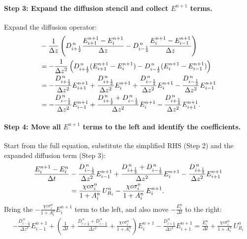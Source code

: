 \documentclass{article}
\begin{document}
\paragraph{Step 3: Expand the diffusion stencil and collect $E^{n+1}$ terms.}
Expand the diffusion operator:
\begin{align}
&-\frac{1}{\Delta z}\left(
D_{i+\frac12}^{\,n}\frac{E_{i+1}^{n+1}-E_i^{n+1}}{\Delta z}
-
D_{i-\frac12}^{\,n}\frac{E_{i}^{n+1}-E_{i-1}^{n+1}}{\Delta z}
\right)\notag\\
&=
-\frac{1}{\Delta z^2}\left(
D_{i+\frac12}^{\,n}(E_{i+1}^{n+1}-E_i^{n+1})
-
D_{i-\frac12}^{\,n}(E_{i}^{n+1}-E_{i-1}^{n+1})
\right)\notag\\
&=
-\frac{D_{i+\frac12}^{\,n}}{\Delta z^2}E_{i+1}^{n+1}
+\frac{D_{i+\frac12}^{\,n}}{\Delta z^2}E_i^{n+1}
+\frac{D_{i-\frac12}^{\,n}}{\Delta z^2}E_i^{n+1}
-\frac{D_{i-\frac12}^{\,n}}{\Delta z^2}E_{i-1}^{n+1}\notag\\
&=
-\frac{D_{i-\frac12}^{\,n}}{\Delta z^2}E_{i-1}^{n+1}
+\frac{D_{i+\frac12}^{\,n}+D_{i-\frac12}^{\,n}}{\Delta z^2}E_i^{n+1}
-\frac{D_{i+\frac12}^{\,n}}{\Delta z^2}E_{i+1}^{n+1}.
\end{align}

\paragraph{Step 4: Move all $E^{n+1}$ terms to the left and identify the coefficients.}
Start from the full equation, substitute the simplified RHS (Step 2) and the expanded diffusion term (Step 3):
\begin{align}
\frac{E_i^{n+1}-E_i^n}{\Delta t}
&-\frac{D_{i-\frac12}^{\,n}}{\Delta z^2}E_{i-1}^{n+1}
+\frac{D_{i+\frac12}^{\,n}+D_{i-\frac12}^{\,n}}{\Delta z^2}E_i^{n+1}
-\frac{D_{i+\frac12}^{\,n}}{\Delta z^2}E_{i+1}^{n+1}\notag\\
&=
\frac{\chi c \sigma_i^{n}}{1+A_i^n}\,U_{R_i}^n
-
\frac{\chi c \sigma_i^{n}}{1+A_i^n}\,E_i^{n+1}.
\end{align}
Bring the $-\frac{\chi c \sigma_i^{n}}{1+A_i^n}E_i^{n+1}$ term to the left, and also move $-\frac{E_i^n}{\Delta t}$ to the right:
\begin{align}
-\frac{D_{i-\frac12}^{\,n}}{\Delta z^2}E_{i-1}^{n+1}
+
\left(
\frac{1}{\Delta t}
+\frac{D_{i+\frac12}^{\,n}+D_{i-\frac12}^{\,n}}{\Delta z^2}
+\frac{\chi c \sigma_i^{n}}{1+A_i^n}
\right)E_i^{n+1}
-\frac{D_{i+\frac12}^{\,n}}{\Delta z^2}E_{i+1}^{n+1}
=
\frac{E_i^n}{\Delta t}
+\frac{\chi c \sigma_i^{n}}{1+A_i^n}\,U_{R_i}^n
\end{align}
\end{document}
